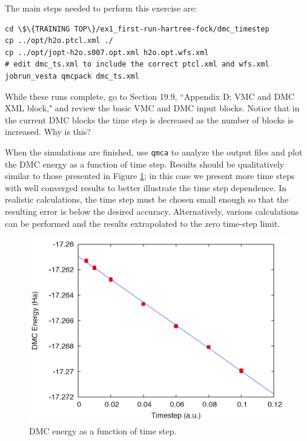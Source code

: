 The main steps needed to perform this exercise are:
\begin{lstlisting}[style=SHELL]
cd \$\{TRAINING TOP\}/ex1_first-run-hartree-fock/dmc_timestep
cp ../opt/h2o.ptcl.xml ./
cp ../opt/jopt-h2o.s007.opt.xml h2o.opt.wfs.xml
# edit dmc_ts.xml to include the correct ptcl.xml and wfs.xml
jobrun_vesta qmcpack dmc_ts.xml
\end{lstlisting}
While these runs complete, go to Section 19.9, ``Appendix D: VMC and DMC XML block," and review the basic VMC and DMC input
blocks. Notice that in the current DMC blocks the time step is decreased as the number of blocks is increased. Why is this?

When the simulations are finished, use \texttt{qmca} to analyze the output files and plot the
DMC energy as a function of time step. Results should be qualitatively similar to those
presented in Figure \ref{fig:lam_dmc_timestep}; in this case we present more time steps with well converged results to
better illustrate the time step dependence. In realistic calculations, the time step must be
chosen small enough so that the resulting error is below the desired accuracy. Alternatively,
various calculations can be performed and the results extrapolated to the zero time-step
limit.


\begin{figure}
\begin{center}
\includegraphics[trim = 0mm 0mm 0mm 0mm, clip,width=0.75\columnwidth]{./figures/lab_advanced_molecules_dmc_timestep.png}
\end{center}
\caption{DMC energy as a function of time step.}
\label{fig:lam_dmc_timestep}
\end{figure}


